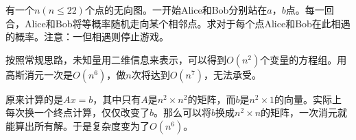 \begin{prob}
	有一个$n(n \le 22)$个点的无向图。一开始Alice和Bob分别站在$a$，$b$点。每一回合，Alice和Bob将等概率随机走向某个相邻点。求对于每个点Alice和Bob在此相遇的概率。注意：一但相遇则停止游戏。
\end{prob}

\begin{sol}
	按照常规思路，未知量用二维信息来表示，可以得到$O(n^2)$个变量的方程组。用高斯消元一次是$O(n^6)$，做$n$次将达到$O(n^7)$，无法承受。\par
	原来计算的是$Ax = b$，其中只有$A$是$n^2 \times n^2$的矩阵，而$b$是$n^2 \times 1$的向量。实际上每次换一个终点计算，仅仅改变了$b$。那么可以将$b$换成$n^2 \times n$的矩阵，一次消元就能算出所有解。于是复杂度变为了$O(n^6)$。
\end{sol}
